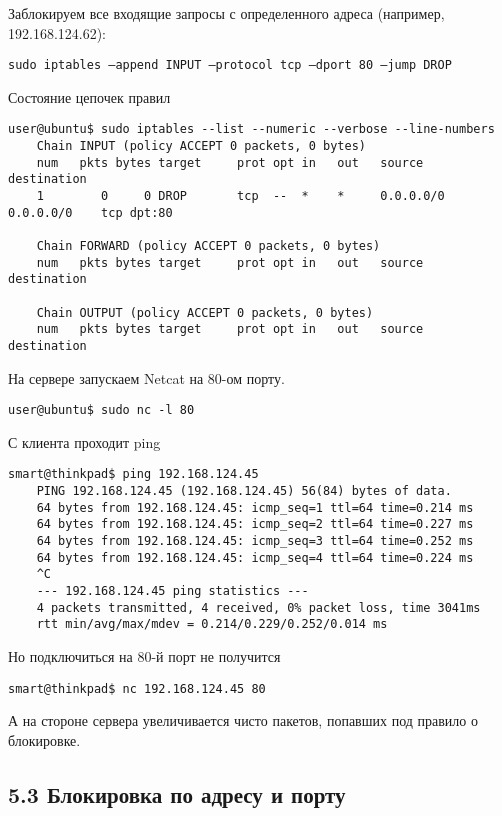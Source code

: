Заблокируем все входящие запросы с определенного адреса (например, 192.168.124.62):

\texttt{sudo iptables --append INPUT --protocol tcp --dport 80 --jump DROP}

Состояние цепочек правил
\begin{Verbatim}[frame=single,breaklines=true,breakanywhere=true]
    user@ubuntu$ sudo iptables --list --numeric --verbose --line-numbers
    Chain INPUT (policy ACCEPT 0 packets, 0 bytes)
    num   pkts bytes target     prot opt in   out   source      destination
    1        0     0 DROP       tcp  --  *    *     0.0.0.0/0   0.0.0.0/0    tcp dpt:80
    
    Chain FORWARD (policy ACCEPT 0 packets, 0 bytes)
    num   pkts bytes target     prot opt in   out   source      destination
    
    Chain OUTPUT (policy ACCEPT 0 packets, 0 bytes)
    num   pkts bytes target     prot opt in   out   source      destination
\end{Verbatim}

На сервере запускаем Netcat на 80-ом порту.
\begin{Verbatim}[frame=single,breaklines=true,breakanywhere=true]
    user@ubuntu$ sudo nc -l 80
\end{Verbatim}

С клиента проходит ping
\begin{Verbatim}[frame=single,breaklines=true,breakanywhere=true]
    smart@thinkpad$ ping 192.168.124.45
    PING 192.168.124.45 (192.168.124.45) 56(84) bytes of data.
    64 bytes from 192.168.124.45: icmp_seq=1 ttl=64 time=0.214 ms
    64 bytes from 192.168.124.45: icmp_seq=2 ttl=64 time=0.227 ms
    64 bytes from 192.168.124.45: icmp_seq=3 ttl=64 time=0.252 ms
    64 bytes from 192.168.124.45: icmp_seq=4 ttl=64 time=0.224 ms
    ^C
    --- 192.168.124.45 ping statistics ---
    4 packets transmitted, 4 received, 0% packet loss, time 3041ms
    rtt min/avg/max/mdev = 0.214/0.229/0.252/0.014 ms
\end{Verbatim}

Но подключиться на 80-й порт не получится
\begin{Verbatim}[frame=single,breaklines=true,breakanywhere=true]
    smart@thinkpad$ nc 192.168.124.45 80
\end{Verbatim}

А на стороне сервера увеличивается чисто пакетов, попавших под правило о блокировке.

\subsection*{5.3 Блокировка по адресу и порту}


